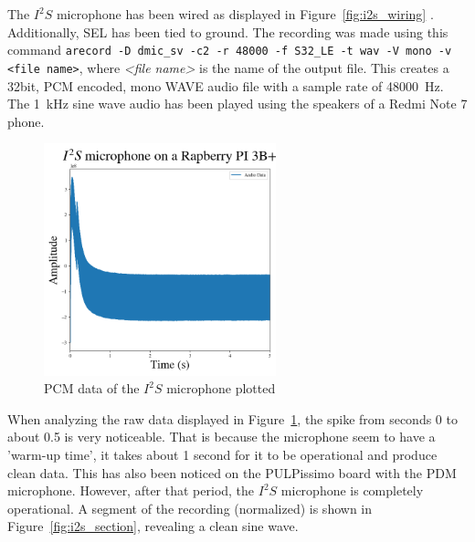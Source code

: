 The $I^2S$ microphone has been wired as displayed in Figure~\ref{fig:i2s_wiring} \cite{i2s_wiring}.
Additionally, SEL has been tied to ground.
The recording was made using this command \lstinline{arecord -D dmic_sv -c2 -r 48000 -f S32_LE -t wav -V mono -v <file name>},
where \emph{<file name>} is the name of the output file.
This creates a 32bit, PCM encoded, mono WAVE audio file with a sample rate of \SI{48000}{\hertz}.
The \SI{1}{\kilo\hertz} sine wave audio has been played using the speakers of a Redmi Note 7 phone.

\begin{figure}[H]
    \centering
    \includegraphics[width=0.6\textwidth]{figures/i2s/i2s_raw_data.png}
    \caption[PCM data of the $I^2S$ microphone plotted]{PCM data of the $I^2S$ microphone plotted}
    \label{fig:i2s_raw}
\end{figure}

When analyzing the raw data displayed in Figure~\ref{fig:i2s_raw}, the spike from seconds 0 to about 0.5
is very noticeable. That is because the microphone seem to have a 'warm-up time', it takes about 1 second for it to be operational and produce clean data.
This has also been noticed on the PULPissimo board with the PDM microphone.
However, after that period, the $I^2S$ microphone is completely operational.
A segment of the recording (normalized) is shown in Figure~\ref{fig:i2s_section}, revealing a clean sine wave.

